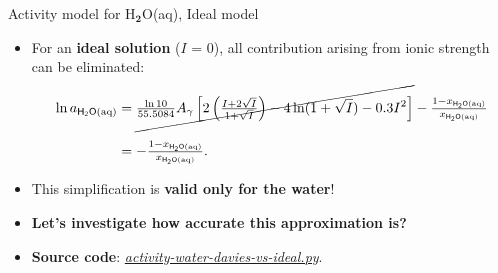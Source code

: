 %
\begin{frame}{Activity model for H$_{\boldsymbol{2}}$O(aq),  Ideal model}
\begin{itemize}[<+->]
\item For an \alert{\textbf{ideal solution}} ($I$ = 0), all contribution arising from ionic strength
can be eliminated:
\begin{alignat*}{2}
\ln a_{\mathsf{H_{2}O\text{(aq)}}} 
& =\cancel{\tfrac{\ln10}{55.5084}A_{\gamma}\left[2\left(\tfrac{I+2\sqrt{I}}{1+\sqrt{I}}\right)-4\ln(1+\sqrt{I})-0.3I^{2}\right]}-\tfrac{1-x_{\mathsf{\mathsf{H_{2}O\text{(aq)}}}}}{x_{\mathsf{\mathsf{H_{2}O\text{(aq)}}}}} \\[10pt]
&=-\tfrac{1-x_{\mathsf{\mathsf{H_{2}O\text{(aq)}}}}}{x_{\mathsf{\mathsf{H_{2}O\text{(aq)}}}}}.
\end{alignat*}
\item This simplification is \textbf{valid only for the water}!
\item \textbf{Let's investigate how accurate this approximation is?} 
\item \textbf{Source code}: \href{https://polybox.ethz.ch/index.php/s/cAmnV8dKZH7AMcK}{\textcolor{indigo(dye)}{\it activity-water-davies-vs-ideal.py}}.
\end{itemize}
\end{frame}
%
%
